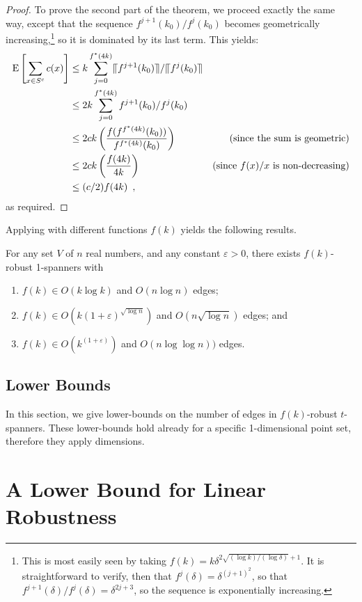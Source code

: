 \documentclass{patmorin}
\newcommand{\eps}{\varepsilon}
\begin{document}
\begin{proof}
To prove the second part of the theorem, we proceed exactly the
same way, except that the sequence $f^{j+1}(k_0)/f^j(k_0)$ becomes
geometrically increasing,\footnote{This is most easily seen by taking
$f(k) = k\delta^{2\sqrt{(\log k)/(\log\delta)}+1}$.  It is straightforward to
verify, then that $f^j(\delta) = \delta^{(j+1)^2}$, so that $f^{j+1}(\delta)/f^j(\delta)= \delta^{2j+3}$,
so the sequence is exponentially increasing.}
so it is dominated by its last term.
This yields:
\begin{align*}
\mathrm{E}\left[\sum_{x\in S^c} c(x)\right] 
    & \le  k \sum_{j=0}^{f^*(4k)} \llceil f^{j+1}(k_0)\rrceil/\llceil f^j(k_0)\rrceil \\
    & \le  2k \sum_{j=0}^{f^*(4k)} f^{j+1}(k_0)/f^j(k_0) \\
    & \le  2ck\left(\frac{f(f^{f^*(4k)}(k_0))}{f^{f^*(4k)}(k_0)}\right) & \text{(since the sum is geometric)} \\
    & \le  2ck\left(\frac{f(4k)}{4k}\right) & \text{(since $f(x)/x$ is non-decreasing)} \\
    & \le  (c/2)f(4k) \enspace ,
\end{align*}
as required.
\end{proof}


Applying  with different functions $f(k)$ yields the
following results.
\begin{cor}
For any set $V$ of $n$ real numbers, and any constant $\eps >0$,
there exists $f(k)$-robust 1-spanners with
\begin{enumerate}
  \item $f(k)\in O(k\log k)$ and $O(n\log n)$ edges;
  \item $f(k)\in O(k(1+\eps)^{\sqrt{\log n}})$ and $O(n\sqrt{\log n})$ edges; and
  \item $f(k)\in O(k^{(1+\eps)})$ and $O(n\log\log n))$ edges.
\end{enumerate}
\end{cor}


\subsection{Lower Bounds}

In this section, we give lower-bounds on the number of edges in
$f(k)$-robust $t$-spanners.  These lower-bounds hold already for a
specific 1-dimensional point set, therefore they apply dimensions.

\section{A Lower Bound for Linear Robustness}
\end{document}
